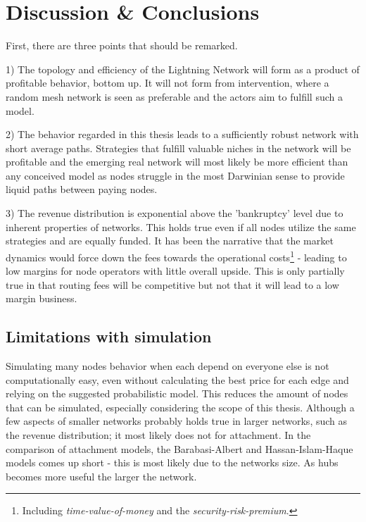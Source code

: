 \chapter{Discussion \& Conclusions}

First, there are three points that should be remarked.
 
1) The topology and efficiency of the \gls{Lightning Network} will form as a product of profitable behavior, bottom up. It will not form from intervention, where a random mesh network is seen as preferable and the actors aim to fulfill such a model.
 
2) The behavior regarded in this thesis leads to a sufficiently robust network with short average paths. Strategies that fulfill valuable niches in the network will be profitable and the emerging real network will most likely be more efficient than any conceived model as nodes struggle in the most Darwinian sense to provide liquid paths between paying nodes.

3) The revenue distribution is exponential above the 'bankruptcy' level due to inherent properties of networks. This holds true even if all nodes utilize the same strategies and are equally funded. It has been the narrative that the market dynamics would force down the fees towards the operational costs\footnote{Including \textit{time-value-of-money} and the \textit{security-risk-premium}.} - leading to low margins for \gls{node} operators with little overall upside. This is only partially true in that routing fees will be competitive but not that it will lead to a low margin business.  

\section{Limitations with simulation}

Simulating many nodes behavior when each depend on everyone else is not computationally easy, even without calculating the best price for each edge and relying on the suggested probabilistic model. This reduces the amount of nodes that can be simulated, especially considering the scope of this thesis. Although a few aspects of smaller networks probably holds true in larger networks, such as the revenue distribution; it most likely does not for attachment. In the comparison of attachment models, the Barabasi-Albert and Hassan-Islam-Haque models comes up short - this is most likely due to the networks size. As hubs becomes more useful the larger the network.  

